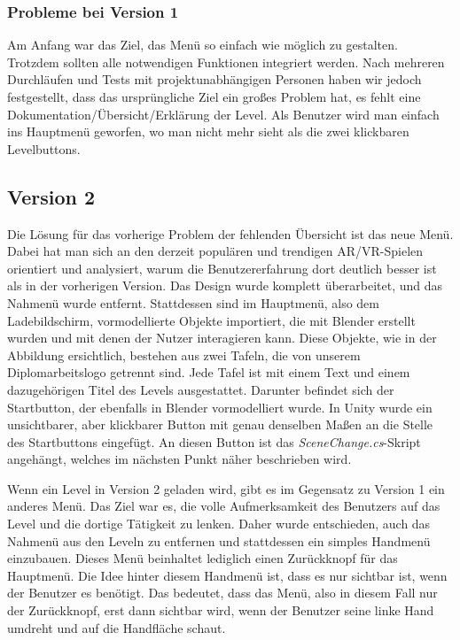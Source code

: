 \subsubsection{Probleme bei Version 1}
Am Anfang war das Ziel, das Menü so einfach wie möglich zu gestalten. Trotzdem sollten alle notwendigen Funktionen integriert werden.
Nach mehreren Durchläufen und Tests mit projektunabhängigen Personen haben wir jedoch festgestellt, dass das ursprüngliche
Ziel ein großes Problem hat, es fehlt eine Dokumentation/Übersicht/Erklärung der Level. Als Benutzer wird man einfach ins
Hauptmenü geworfen, wo man nicht mehr sieht als die zwei klickbaren Levelbuttons.

\subsection{Version 2} %
Die Lösung für das vorherige Problem der fehlenden Übersicht ist das neue Menü. Dabei hat man sich an den derzeit
populären und trendigen AR/VR-Spielen orientiert und analysiert, warum die Benutzererfahrung dort deutlich besser ist
als in der vorherigen Version. Das Design wurde komplett überarbeitet, und das Nahmenü wurde entfernt. Stattdessen sind
im Hauptmenü, also dem Ladebildschirm, vormodellierte Objekte importiert, die mit Blender erstellt wurden und mit denen
der Nutzer interagieren kann. Diese Objekte, wie in der Abbildung ersichtlich, bestehen aus zwei Tafeln, die von unserem
Diplomarbeitslogo getrennt sind. Jede Tafel ist mit einem Text und einem dazugehörigen Titel des Levels ausgestattet.
Darunter befindet sich der Startbutton, der ebenfalls in Blender vormodelliert wurde. In Unity wurde ein unsichtbarer,
aber klickbarer Button mit genau denselben Maßen an die Stelle des Startbuttons eingefügt. An diesen Button ist das
\textit{SceneChange.cs}-Skript angehängt, welches im nächsten Punkt näher beschrieben wird.

Wenn ein Level in Version 2 geladen wird, gibt es im Gegensatz zu Version 1 ein anderes Menü. Das Ziel war es, die volle
Aufmerksamkeit des Benutzers auf das Level und die dortige Tätigkeit zu lenken. Daher wurde entschieden, auch das Nahmenü
aus den Leveln zu entfernen und stattdessen ein simples Handmenü einzubauen. Dieses Menü beinhaltet lediglich einen
Zurückknopf für das Hauptmenü. Die Idee hinter diesem Handmenü ist, dass es nur sichtbar ist, wenn der Benutzer es benötigt.
Das bedeutet, dass das Menü, also in diesem Fall nur der Zurückknopf, erst dann sichtbar wird, wenn der Benutzer seine
linke Hand umdreht und auf die Handfläche schaut.


